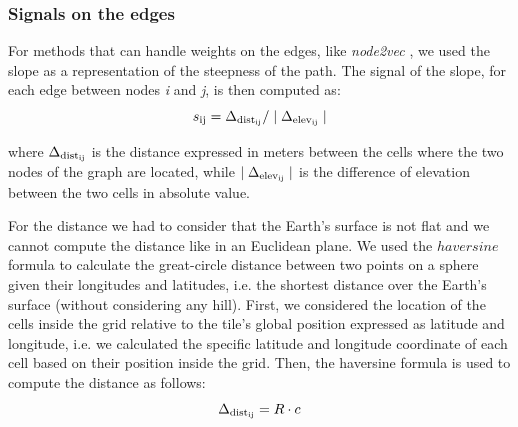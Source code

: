\subsubsection{Signals on the edges}
For methods that can handle weights on the edges, like \textit{node2vec} \cite{grover2016node2vec}, we used the slope as a representation of the steepness of the path. The signal of the slope, for each edge between nodes \textit{i} and \textit{j}, is then computed as:
\begin{equation} \label{slope}
s\textsubscript{ij} = \Delta \textsubscript{dist\textsubscript{ij}} / \mid\Delta \textsubscript{elev\textsubscript{ij}}\mid
\end{equation}

where \( \Delta \textsubscript{dist\textsubscript{ij}} \) is the distance expressed in meters between the cells where the two nodes of the graph are located, while \(\mid\Delta \textsubscript{elev\textsubscript{ij}}\mid\) is the difference of elevation between the two cells in absolute value. 

For the distance we had to consider that the Earth's surface is not flat and we cannot compute the distance like in an Euclidean plane. We used the \(haversine\) formula to calculate the great-circle distance between two points on a sphere given their longitudes and latitudes, i.e. the shortest distance over the Earth's surface (without considering any hill). First, we considered the location of the cells inside the grid relative to the tile's global position expressed as latitude and longitude, i.e. we calculated the specific latitude and longitude coordinate of each cell based on their position inside the grid. Then, the haversine formula is used to compute the distance as follows:
\begin{equation} \label{distance_haversine}
\Delta \textsubscript{dist\textsubscript{ij}} = R\cdot c 
\end{equation}

